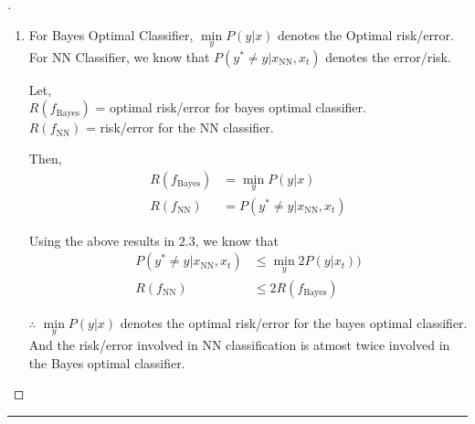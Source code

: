 \documentclass[a4paper, 12pt]{article}
\begin{document}
\begin{proof}[]
\begin{enumerate}[label={\color{blue}{\textbf{2.\arabic*})}}]
    \item 
        For Bayes Optimal Classifier, $\min\limits_y P(y|x)$ denotes the Optimal risk/error. \\
        For NN Classifier, we know that $P(y^* \neq y|x_{\text{NN}},x_t)$ denotes the error/risk. 
        
        Let, \\
        $R(f_{\text{Bayes}})$ = optimal risk/error for bayes optimal classifier.\\
        $R(f_{\text{NN}})$ = risk/error for the NN classifier.
        
        Then, 
        \begin{align*}
            R(f_{\text{Bayes}}) &= \min\limits_y P(y|x) \\
        R(f_{\text{NN}}) &= P(y^* \neq y|x_{\text{NN}},x_t)
        \end{align*}
        
        
        
        Using the above results in $2.3$, we know that 
        \begin{align*}
            P(y^* \neq y|x_{\text{NN}},x_t) &\leq  \min\limits_y 2P(y|x_t)) \\
            R(f_{\text{NN}}) &\leq 2R(f_{\text{Bayes}})
        \end{align*}
        
        $\therefore$ $\min\limits_y P(y|x)$ denotes the optimal risk/error for the bayes optimal classifier. And the risk/error involved in NN classification is atmost twice involved in the Bayes optimal classifier. 
    
\end{enumerate}
\end{proof}


\hrule
\bigskip
\end{document}
